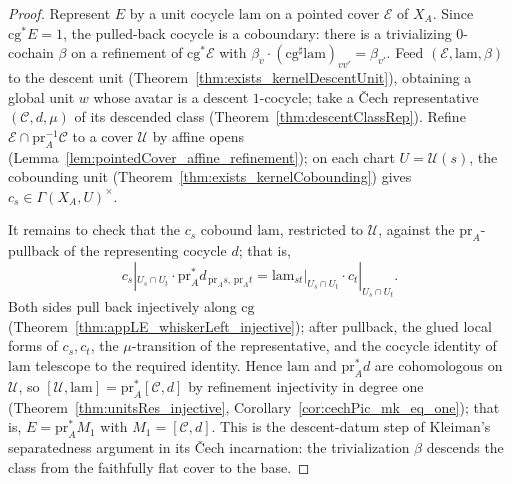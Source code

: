 \begin{proof}
  \leanok
  Represent \(E\) by a unit cocycle \(\mathrm{lam}\) on a pointed cover \(\mathcal E\) of
  \(X_A\).  Since \(\mathrm{cg}^{*} E = 1\), the pulled-back cocycle is a coboundary: there is a
  trivializing \(0\)-cochain \(\beta\) on a refinement of \(\mathrm{cg}^{*}\mathcal E\) with
  \(\beta_v \cdot (\mathrm{cg}^{\sharp}\mathrm{lam})_{vv'} = \beta_{v'}\).  Feed \((\mathcal E,
  \mathrm{lam}, \beta)\) to the descent unit (Theorem~\ref{thm:exists_kernelDescentUnit}),
  obtaining a global unit \(w\) whose avatar is a descent \(1\)-cocycle; take a \v Cech
  representative \((\mathcal C, d, \mu)\) of its descended class
  (Theorem~\ref{thm:descentClassRep}).  Refine \(\mathcal E \cap \mathrm{pr}_A^{-1}\mathcal C\)
  to a cover \(\mathcal U\) by affine opens (Lemma~\ref{lem:pointedCover_affine_refinement}); on
  each chart \(U = \mathcal U(s)\), the cobounding unit
  (Theorem~\ref{thm:exists_kernelCobounding}) gives \(c_s \in \Gamma(X_A, U)^{\times}\).

  It remains to check that the \(c_s\) cobound \(\mathrm{lam}\), restricted to \(\mathcal U\),
  against the \(\mathrm{pr}_A\)-pullback of the representing cocycle \(d\); that is,
  \[
    c_s|_{U_s \cap U_t} \cdot \mathrm{pr}_A^{*} d_{\,\mathrm{pr}_A s,\,\mathrm{pr}_A t}
      = \mathrm{lam}_{s t}\big|_{U_s \cap U_t} \cdot c_t|_{U_s \cap U_t}.
  \]
  Both sides pull back injectively along \(\mathrm{cg}\)
  (Theorem~\ref{thm:appLE_whiskerLeft_injective}); after pullback, the glued local forms of
  \(c_s, c_t\), the \(\mu\)-transition of the representative, and the cocycle identity of
  \(\mathrm{lam}\) telescope to the required identity.  Hence \(\mathrm{lam}\) and
  \(\mathrm{pr}_A^{*} d\) are cohomologous on \(\mathcal U\), so \([\mathcal U, \mathrm{lam}] =
  \mathrm{pr}_A^{*}[\mathcal C, d]\) by refinement injectivity in degree one
  (Theorem~\ref{thm:unitsRes_injective}, Corollary~\ref{cor:cechPic_mk_eq_one}); that is, \(E =
  \mathrm{pr}_A^{*} M_1\) with \(M_1 = [\mathcal C, d]\).  This is the descent-datum step of
  Kleiman's separatedness argument in its \v Cech incarnation: the trivialization \(\beta\)
  descends the class from the faithfully flat cover to the base.
\end{proof}

